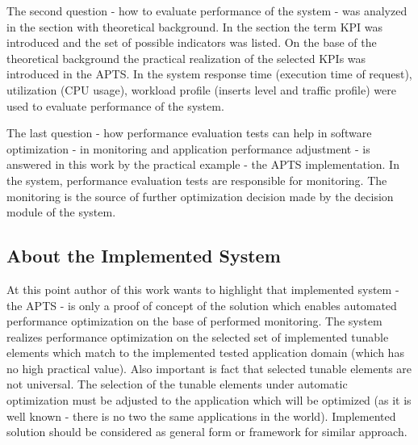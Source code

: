 \documentclass[12pt,a4paper]{article}
\begin{document}
The second question - how to evaluate performance of the system - was analyzed in the section with theoretical background. In the section the term KPI was introduced and the set of possible indicators was listed. On the base of the theoretical background the practical realization of the selected KPIs was introduced in the APTS. In the system response time (execution time of request), utilization (CPU usage), workload profile (inserts level and traffic profile) were used to evaluate performance of the system.

The last question - how performance evaluation tests can help in software optimization - in monitoring and application performance adjustment - is answered in this work by the practical example - the APTS implementation. In the system, performance evaluation tests are responsible for monitoring. The monitoring is the source of further optimization decision made by the decision module of the system.  


\subsection{About the Implemented System}

At this point author of this work wants to highlight that implemented system - the APTS - is only a proof of concept of the solution which enables automated performance optimization on the base of performed monitoring. The system realizes performance optimization on the selected set of implemented tunable elements which match to the implemented tested application domain (which has no high practical value). Also important is fact that selected tunable elements are not universal. The selection of the tunable elements under automatic optimization must be adjusted to the application which will be optimized (as it is well known - there is no two the same applications in the world). Implemented solution should be considered as general form or framework for similar approach. 
\end{document}
